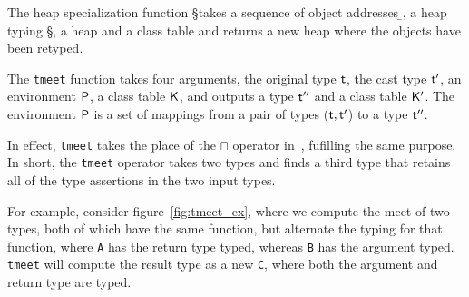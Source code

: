 \documentclass[a4paper,USenglish]{tex/lipics-v2016}
\begin{document}
The heap specialization function \spec{\b\a}\S\s\K takes a
sequence of object addresses \b\a, a heap typing \S, a heap \s
and a class table \K and returns a new heap where the objects
have been retyped.

\begin{mathpar}

\end{mathpar}


% 

The \texttt{tmeet} function takes four arguments, the original type
$\t$, the cast type $\tp$, an environment $\P$, a class table $\K$, and
outputs a type $\tpp$ and a class table $\Kp$. The environment $\P$ is a set
of mappings from a pair of types ($\t,\tp$) to a type $\tpp$. 

In effect, \texttt{tmeet} takes the place of the $\sqcap$ operator in~\cite{Siek2015},
fufilling the same purpose. In short, the \texttt{tmeet} operator takes two types
and finds a third type that retains all of the type assertions in the two input types.

For example, consider figure~\ref{fig:tmeet_ex}, where we compute the meet of two types,
both of which have the same function, but alternate the typing for that function, where
\texttt{A} has the return type typed, whereas \texttt{B} has the argument typed. \texttt{tmeet}
will compute the result type as a new \texttt{C}, where both the argument and return type 
are typed.
\end{document}
